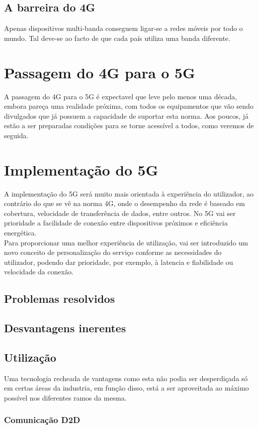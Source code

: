 \documentclass{llncs}
\begin{document}
\subsection{A barreira do 4G}
Apenas dispositivos multi-banda conseguem ligar-se a redes móveis por
todo o mundo. Tal deve-se ao facto de que cada país utiliza uma banda
diferente.

\section{Passagem do 4G para o 5G}
A passagem do 4G para o 5G é expectavel que leve pelo menos uma
década, embora pareça uma realidade próxima, com todos os 
equipamentos que vão sendo divulgados que já possuem a capacidade
de suportar esta norma. Aos poucos, já estão a ser preparadas
condições para se torne acessível a todos, como veremos de 
seguida.

\section{Implementação do 5G}
A implementação do 5G será muito mais orientada à experiência do
utilizador, ao contrário do que se vê na norma 4G, onde o 
desempenho da rede é baseado em cobertura, velocidade de 
transferência de dados, entre outros. No 5G vai ser prioridade a
facilidade de conexão entre dispositivos próximos e eficiência
energética.\\
Para proporcionar uma melhor experiência de utilização, vai ser
introduzido um novo conceito de personalização do serviço
conforme as necessidades do utilizador, podendo dar prioridade,
por exemplo, à latencia e fiabilidade ou velocidade da conexão.

\subsection{Problemas resolvidos}
\subsection{Desvantagens inerentes}
\subsection{Utilização}
Uma tecnologia recheada de vantagens como esta não podia ser desperdiçada
só em certas áreas da industria, em função disso, está a ser aproveitada
ao máximo possível nos diferentes ramos da mesma.
\subsubsection{Comunicação D2D}
\end{document}
